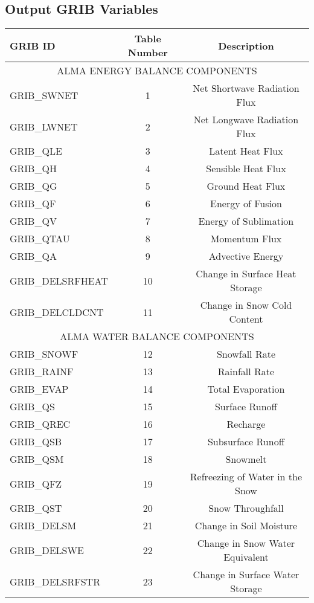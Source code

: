 \subsection{ Output GRIB Variables }
 \setlongtables
 \begin{longtable}{|l|c|c|}
  \hline
  GRIB ID & Table Number & Description \\
  \hline
  \multicolumn{3}{|c|}{ALMA ENERGY BALANCE COMPONENTS} \\
  \hline
  GRIB\_SWNET      & 1 & Net Shortwave Radiation Flux \\ 
  GRIB\_LWNET      & 2 & Net Longwave Radiation Flux \\ 
  GRIB\_QLE        & 3 & Latent Heat Flux \\
  GRIB\_QH         & 4 & Sensible Heat Flux\\
  GRIB\_QG         & 5 & Ground Heat Flux \\
  GRIB\_QF         & 6 & Energy of Fusion \\ 
  GRIB\_QV         & 7 & Energy of Sublimation \\
  GRIB\_QTAU       & 8 & Momentum Flux \\
  GRIB\_QA         & 9 & Advective Energy\\
  GRIB\_DELSRFHEAT & 10 & Change in Surface Heat Storage \\
  GRIB\_DELCLDCNT  & 11 & Change in Snow Cold Content \\
  \hline
  \multicolumn{3}{|c|}{ALMA WATER BALANCE COMPONENTS} \\
  \hline
  GRIB\_SNOWF      & 12 & Snowfall Rate \\
  GRIB\_RAINF      & 13 & Rainfall Rate \\
  GRIB\_EVAP       & 14 & Total Evaporation \\
  GRIB\_QS         & 15 & Surface Runoff \\
  GRIB\_QREC       & 16 & Recharge \\ 
  GRIB\_QSB        & 17 & Subsurface Runoff \\
  GRIB\_QSM        & 18 & Snowmelt \\
  GRIB\_QFZ        & 19 & Refreezing of Water in the Snow \\
  GRIB\_QST        & 20 & Snow Throughfall \\
  GRIB\_DELSM      & 21 & Change in Soil Moisture \\
  GRIB\_DELSWE     & 22 & Change in Snow Water Equivalent \\
  GRIB\_DELSRFSTR  & 23 & Change in Surface Water Storage \\

\end{longtable}
